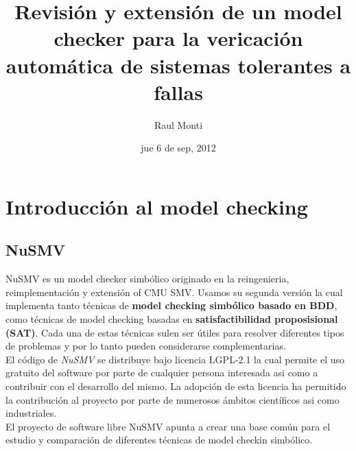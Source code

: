\documentclass[titlepage, 10pt]{article}
\title{Revisi\'{o}n y extensi\'{o}n de un model checker para la vericaci\'{o}n autom\'{a}tica de sistemas tolerantes a fallas}
\author{Raul Monti}
\date{jue 6 de sep, 2012}
\begin{document}
\maketitle

\tableofcontents

\newpage
\section{Introducci\'on al model checking}
\label{introduction}
\subsection{\textbf{NuSMV}}

NuSMV\cite{NuSMVBibl} es un model checker simb\'olico originado en la reingenieria, reimplementaci\'on
y extensi\'on of CMU SMV. Usamos su segunda versi\'on la cual implementa tanto t\'ecnicas
de \textbf{model checking simb\'olico basado en BDD}, como  t\'ecnicas de model checking
basadas en \textbf{satisfactibilidad proposisional (SAT)}.
Cada una de estas t\'ecnicas sulen ser \'utiles para resolver diferentes tipos
de problemas y por lo tanto pueden considerarse complementarias.\\

El c\'odigo de \emph{NuSMV} se distribuye bajo licencia LGPL-2.1 la cual permite el 
uso gratuito del software por parte de cualquier persona interesada asi como a 
contribuir con el desarrollo del mismo. La adopci\'on de esta licencia ha permitido la
contribuci\'on al proyecto por parte de numerosos \'ambitos cient\'ificos asi como
industriales.\\

El proyecto de software libre NuSMV apunta a crear una base com\'un para
el estudio y comparaci\'on de diferentes t\'ecnicas de model checkin simb\'olico.\\
\end{document}
